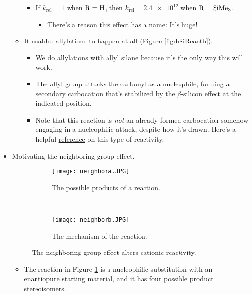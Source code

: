 \documentclass[../notes.tex]{subfiles}
\begin{document}
\begin{itemize}
\begin{itemize}
\begin{itemize}
            \item If $k_\text{rel}=1$ when $\ce{R}=\ce{H}$, then $k_\text{rel}=\num{2.4e12}$ when $\ce{R}=\ce{SiMe3}$.
            \begin{itemize}
                \item There's a reason this effect has a name: It's huge!
            \end{itemize}
        \end{itemize}
        \item It enables allylations to happen at all (Figure \ref{fig:bSiReactb}).
        \begin{itemize}
            \item We do allylations with allyl silane because it's the only way this will work.
            \item The allyl group attacks the carbonyl as a nucleophile, forming a secondary carbocation that's stabilized by the $\beta$-silicon effect at the indicated position.
            \item Note that this reaction is \emph{not} an already-formed carbocation somehow engaging in a nucleophilic attack, despite how it's drawn. Here's a helpful \href{https://www.uwindsor.ca/people/jgreen/sites/uwindsor.ca.people.jgreen/files/41-45.pdf}{reference} on this type of reactivity.
        \end{itemize}
    \end{itemize}
    \item Motivating the neighboring group effect.
    \begin{figure}[H]
        \centering
        \begin{subfigure}[b]{\linewidth}
            \centering
            \texttt{[image: neighbora.JPG]}
            \caption{The possible products of a reaction.}
            \label{fig:neighbora}
        \end{subfigure}\\[2em]
        \begin{subfigure}[b]{\linewidth}
            \centering
            \texttt{[image: neighborb.JPG]}
            \caption{The mechanism of the reaction.}
            \label{fig:neighborb}
        \end{subfigure}
        \caption{The neighboring group effect alters cationic reactivity.}
        \label{fig:neighbor}
    \end{figure}
    \begin{itemize}
        \item The reaction in Figure \ref{fig:neighbora} is a nucleophilic substitution with an enantiopure starting material, and it has four possible product stereoisomers.

\end{itemize}
\end{itemize}
\end{document}
